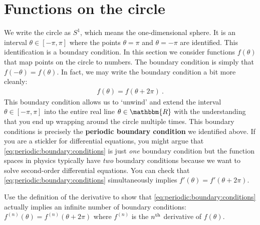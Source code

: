\section{Functions on the circle}

We write the circle as $S^1$, which means the one-dimensional sphere. It is an interval $\theta \in [-\pi, \pi]$ where the points $\theta = \pi$ and $\theta = -\pi$ are identified. This identification is a boundary condition. In this section we consider functions $f(\theta)$ that map points on the circle to numbers. The boundary condition is simply that $f(-\theta) = f(\theta)$. In fact, we may write the boundary condition a bit more cleanly:
\begin{align}
    f(\theta) = f(\theta+2\pi) 
    \label{eq:periodic:boundary:conditions}
    \ .
\end{align}
This boundary condition allows us to `unwind' and extend the interval $\theta \in [-\pi, \pi]$ into the entire real line $\theta \in \mathbbm{R}$ with the understanding that you end up wrapping around the circle multiple times.
% 
This boundary conditions is precisely the \textbf{periodic boundary condition} we identified above.  
% 
If you are a stickler for differential equations, you might argue that \eqref{eq:periodic:boundary:conditions} is just \emph{one} boundary condition but the function spaces in physics typically have \emph{two} boundary conditions because we want to solve second-order differential equations. You can check that \eqref{eq:periodic:boundary:conditions} simultaneously implies $f'(\theta) = f'(\theta + 2\pi)$.

\begin{exercise}
Use the definition of the derivative to show that \eqref{eq:periodic:boundary:conditions} actually implies an infinite number of boundary conditions: $f^{(n)}(\theta) = f^{(n)}(\theta+ 2\pi)$ where $f^{(n)}$ is the $n^\textnormal{th}$ derivative of $f(\theta)$. 
\end{exercise}

